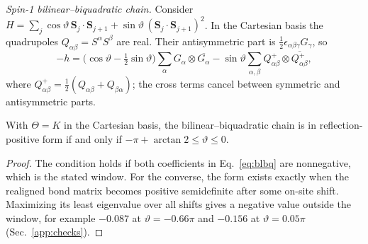 \documentclass[aps,prl,reprint,amsmath,amssymb,nofootinbib,raggedbottom]{revtex4-2}
\begin{document}
\emph{Spin-1 bilinear--biquadratic chain.}
Consider $H=\sum_j\cos\vartheta\,\bm S_j\cdot\bm S_{j+1}
+\sin\vartheta\,(\bm S_j\cdot\bm S_{j+1})^2$. In the Cartesian basis the
quadrupoles $Q_{\alpha\beta}=S^\alpha S^\beta$ are real. Their antisymmetric
part is $\frac12\epsilon_{\alpha\beta\gamma}G_\gamma$, so
\begin{equation}
 -h=\bigl(\cos\vartheta-\tfrac12\sin\vartheta\bigr)\sum_\alpha G_\alpha\otimes\overline{G_\alpha}
 -\sin\vartheta\sum_{\alpha,\beta}Q^{+}_{\alpha\beta}\otimes\overline{Q^{+}_{\alpha\beta}},
 \label{eq:blbq}
\end{equation}
where $Q^+_{\alpha\beta}=\frac12(Q_{\alpha\beta}+Q_{\beta\alpha})$; the cross terms cancel between symmetric and antisymmetric parts.
\begin{proposition}\label{prop:blbq}
With $\Theta=K$ in the Cartesian basis, the bilinear--biquadratic chain is
in reflection-positive form if and only if
$-\pi+\arctan2\le\vartheta\le0$.
\end{proposition}
\begin{proof}
The condition holds if both coefficients in Eq.~\eqref{eq:blbq} are
nonnegative, which is the stated window. For the converse, the form exists exactly
when the realigned bond matrix becomes positive semidefinite after some
on-site shift. Maximizing its least eigenvalue over all shifts gives a negative
value outside the window, for example $-0.087$ at $\vartheta=-0.66\pi$ and
$-0.156$ at $\vartheta=0.05\pi$ (Sec.~\ref{app:checks}).
\end{proof}
\end{document}
